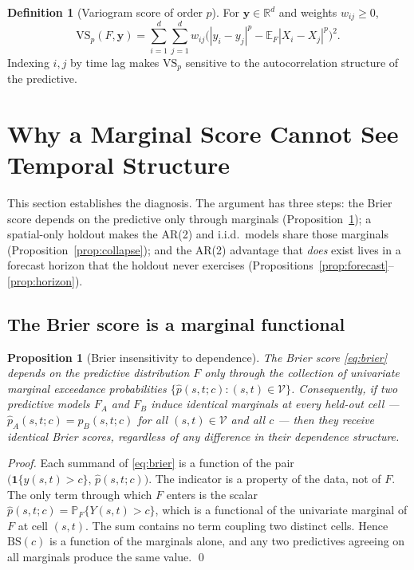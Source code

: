 \documentclass[11pt]{article}
\newtheorem{proposition}{Proposition}
\theoremstyle{definition}
\newtheorem{definition}{Definition}
\theoremstyle{remark}
\newcommand{\R}{\mathbb{R}}
\newcommand{\E}{\mathbb{E}}
\renewcommand{\Pr}{\mathbb{P}}
\newcommand{\indicator}{\mathbf{1}}
\begin{document}
\begin{definition}[Variogram score of order $p$]
\label{def:variogram}
For $\bm y \in \R^d$ and weights $w_{ij}\ge 0$,
\begin{equation}
  \mathrm{VS}_p(F,\bm y)
  = \sum_{i=1}^d \sum_{j=1}^d
    w_{ij}
    \Big(
      |y_i - y_j|^p - \E_F |X_i - X_j|^p
    \Big)^2 .
  \label{eq:variogram}
\end{equation}
Indexing $i,j$ by time lag makes $\mathrm{VS}_p$ sensitive to the
autocorrelation structure of the predictive.
\end{definition}

\section{Why a Marginal Score Cannot See Temporal Structure}
\label{sec:derivations}

This section establishes the diagnosis. The argument has three steps:
the Brier score depends on the predictive only through marginals
(Proposition~\ref{prop:brier-marginal}); a spatial-only holdout makes
the AR(2) and i.i.d.\ models share those marginals
(Proposition~\ref{prop:collapse}); and the AR(2) advantage that
\emph{does} exist lives in a forecast horizon that the holdout never
exercises (Propositions~\ref{prop:forecast}--\ref{prop:horizon}).

\subsection{The Brier score is a marginal functional}

\begin{proposition}[Brier insensitivity to dependence]
\label{prop:brier-marginal}
The Brier score \eqref{eq:brier} depends on the predictive
distribution $F$ only through the collection of univariate marginal
exceedance probabilities $\{\hat p(s,t;c) : (s,t)\in\mathcal{V}\}$.
Consequently, if two predictive models $F_A$ and $F_B$ induce identical
marginals at every held-out cell --- $\hat p_A(s,t;c) = \hat p_B(s,t;c)$
for all $(s,t)\in\mathcal{V}$ and all $c$ --- then they receive
identical Brier scores, regardless of any difference in their
dependence structure.
\end{proposition}

\begin{proof}
Each summand of \eqref{eq:brier} is a function of the pair
$\big(\indicator\{y(s,t)>c\},\,\hat p(s,t;c)\big)$. The indicator is a
property of the data, not of $F$. The only term through which $F$
enters is the scalar $\hat p(s,t;c) = \Pr_F\{Y(s,t)>c\}$, which is a
functional of the univariate marginal of $F$ at cell $(s,t)$. The sum
contains no term coupling two distinct cells. Hence $\mathrm{BS}(c)$ is
a function of the marginals alone, and any two predictives agreeing on
all marginals produce the same value. \qed
\end{proof}
\end{document}
